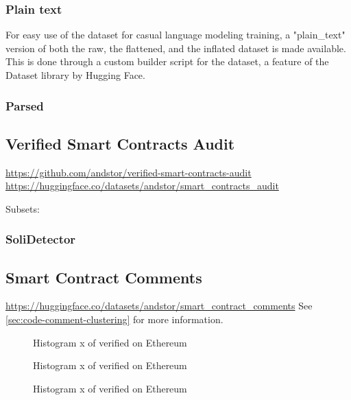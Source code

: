 \subsubsection{Plain text}
\label{sec:verified-smart-contracts-plain-text}
For easy use of the dataset for casual language modeling training, a "plain\_text" version of both the raw, the flattened, and the inflated dataset is made available. This is done through a custom builder script for the dataset, a feature of the Dataset library by Hugging Face.

\subsubsection{Parsed}
\label{sec:verified-smart-contracts-parsed}

\subsection{Verified Smart Contracts Audit}
\label{sec:verified-smart-contracts-audit}

\url{https://github.com/andstor/verified-smart-contracts-audit}
\url{https://huggingface.co/datasets/andstor/smart_contracts_audit}

Subsets:
\subsubsection{SoliDetector}
\label{sec:verified-smart-contracts-audit-solidector}



\subsection{Smart Contract Comments}
\label{sec:verified-smart-contracts-comments}

\url{https://huggingface.co/datasets/andstor/smart_contract_comments}
See \cref{sec:code-comment-clustering} for more information.


\begin{figure}[ht]
    \centering
    
    \caption{Histogram \small x of verified  on Ethereum}
\end{figure}



\begin{figure}[ht]
    \centering
    
    \caption{Histogram \small x of verified  on Ethereum}
\end{figure}


\begin{figure}[ht]
    \centering
    
    \caption{Histogram \small x of verified  on Ethereum}
\end{figure}
